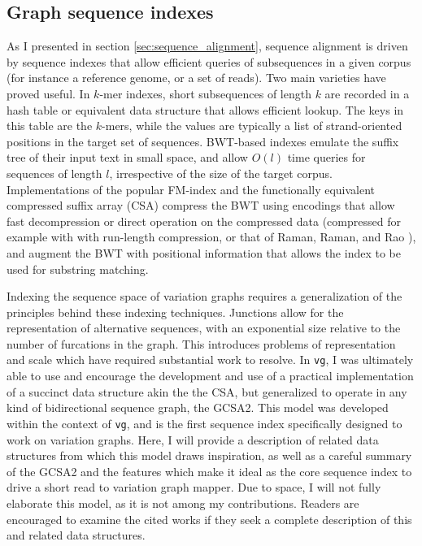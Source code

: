 \subsection{Graph sequence indexes}
\label{sec:graph_sequence_indexes}

As I presented in section \ref{sec:sequence_alignment}, sequence alignment is driven by sequence indexes that allow efficient queries of subsequences in a given corpus (for instance a reference genome, or a set of reads).
Two main varieties have proved useful.
In $k$-mer indexes, short subsequences of length $k$ are recorded in a hash table or equivalent data structure that allows efficient lookup.
The keys in this table are the $k$-mers, while the values are typically a list of strand-oriented positions in the target set of sequences.
BWT-based indexes emulate the suffix tree of their input text in small space, and allow $O(l)$ time queries for sequences of length $l$, irrespective of the size of the target corpus.
Implementations of the popular FM-index \cite{fmindex2000,fmindex2005} and the functionally equivalent compressed suffix array (CSA) \cite{grossi2005compressed} compress the BWT using encodings that allow fast decompression or direct operation on the compressed data (compressed for example with with run-length compression, or that of Raman, Raman, and Rao \cite{raman2002succinct}), and augment the BWT with positional information that allows the index to be used for substring matching.

Indexing the sequence space of variation graphs requires a generalization of the principles behind these indexing techniques.
Junctions allow for the representation of alternative sequences, with an exponential size relative to the number of furcations in the graph.
This introduces problems of representation and scale which have required substantial work to resolve.
In {\tt vg}, I was ultimately able to use and encourage the development and use of a practical implementation of a succinct data structure akin the the CSA, but generalized to operate in any kind of bidirectional sequence graph, the GCSA2.
This model was developed within the context of {\tt vg}, and is the first sequence index specifically designed to work on variation graphs.
Here, I will provide a description of related data structures from which this model draws inspiration, as well as a careful summary of the GCSA2 and the features which make it ideal as the core sequence index to drive a short read to variation graph mapper.
Due to space, I will not fully elaborate this model, as it is not among my contributions.
Readers are encouraged to examine the cited works if they seek a complete description of this and related data structures.

